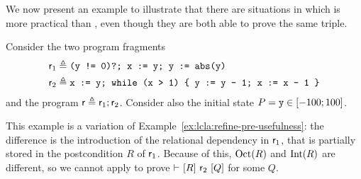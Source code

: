 We now present an example to illustrate that there are situations in which  is more practical than , even though they are both able to prove the same triple.
\begin{example}
	Consider the two program fragments
	\begin{align*}
		\mathsf{r}_1 & \triangleq \texttt{(y != 0)?; x := y; y := abs(y)}                     \\
		\mathsf{r}_2 & \triangleq \texttt{x := y; while (x > 1) \{ y := y - 1; x := x - 1 \}}
	\end{align*}
	and the program $\mathsf{r} \triangleq \mathsf{r}_1; \mathsf{r}_2$. Consider also the initial state $P = \texttt{y} \in [-100; 100]$.

	This example is a variation of Example~\ref{ex:lcla:refine-pre-usefulness}: the difference is the introduction of the relational dependency  in $\mathsf{r}_1$, that is partially stored in the postcondition $R$ of $\mathsf{r}_1$. Because of this, $\text{Oct}(R)$ and $\text{Int}(R)$ are different, so we cannot apply  to prove $\vdash_{}\nobreak[R]~\mathsf{r}_2~[Q]$ for some $Q$.



\end{example}
